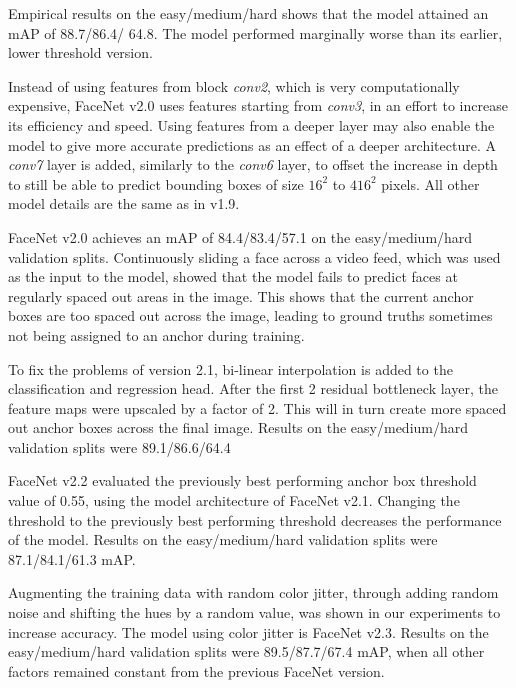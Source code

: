 \documentclass[paperwidth=48in,paperheight=48in, fontscale=0.4166666666666, landscape]{baposter}
\begin{document}
\begin{poster}
{Empirical results on the easy/medium/hard shows that the model attained an mAP of 88.7/86.4/ 64.8. The model performed marginally worse than its earlier, lower threshold version.

Instead of using features from block \textit{conv2}, which is very computationally expensive, FaceNet v2.0 uses features starting from \textit{conv3}, in an effort to increase its efficiency and speed. Using features from a deeper layer may also enable the model to give more accurate predictions as an effect of a deeper architecture. A \textit{conv7} layer is added, similarly to the \textit{conv6} layer, to offset the increase in depth to still be able to predict bounding boxes of size $16^2$ to $416^2$ pixels. All other model details are the same as in v1.9.

FaceNet v2.0 achieves an mAP of 84.4/83.4/57.1 on the easy/medium/hard validation splits. Continuously sliding a face across a video feed, which was used as the input to the model, showed that the model fails to predict faces at regularly spaced out areas in the image. This shows that the current anchor boxes are too spaced out across the image, leading to ground truths sometimes not being assigned to an anchor during training.

To fix the problems of version 2.1, bi-linear interpolation is added to the classification and regression head. After the first 2 residual bottleneck layer, the feature maps were upscaled by a factor of 2. This will in turn create more spaced out anchor boxes across the final image. Results on the easy/medium/hard validation splits were 89.1/86.6/64.4

FaceNet v2.2 evaluated the previously best performing anchor box threshold value of 0.55, using the model architecture of FaceNet v2.1. Changing the threshold to the previously best performing threshold decreases the performance of the model. Results on the easy/medium/hard validation splits were 87.1/84.1/61.3 mAP.

Augmenting the training data with random color jitter, through adding random noise and shifting the hues by a random value, was shown in our experiments to increase accuracy. The model using color jitter is FaceNet v2.3. Results on the easy/medium/hard validation splits were 89.5/87.7/67.4 mAP, when all other factors remained constant from the previous FaceNet version.

}
\end{poster}
\end{document}
